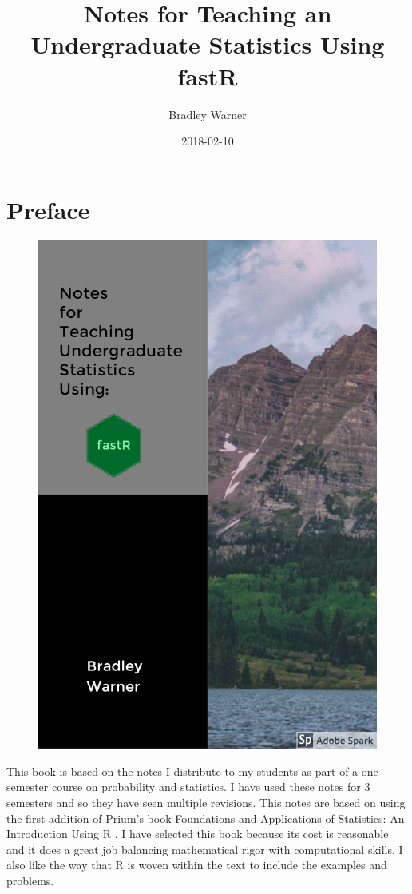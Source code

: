 \documentclass[]{book}
\title{Notes for Teaching an Undergraduate Statistics Using fastR}
\author{Bradley Warner}
\date{2018-02-10}
\theoremstyle{definition}
\theoremstyle{definition}
\theoremstyle{definition}
\theoremstyle{remark}
\begin{document}
\maketitle

{
\setcounter{tocdepth}{1}
\tableofcontents
}
\chapter*{Preface}\label{preface}

\begin{figure}
\centering
\includegraphics{./images/Cover3.jpg}
\caption{}
\end{figure}

This book is based on the notes I distribute to my students as part of a
one semester course on probability and statistics. I have used these
notes for 3 semesters and so they have seen multiple revisions. This
notes are based on using the first addition of Prium's book Foundations
and Applications of Statistics: An Introduction Using R
\citeyearpar{pruim2011foundations}. I have selected this book because
its cost is reasonable and it does a great job balancing mathematical
rigor with computational skills. I also like the way that R is woven
within the text to include the examples and problems.
\end{document}
